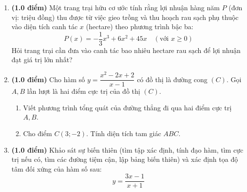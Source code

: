 \documentclass[12pt]{article}
\begin{document}
	\begin{enumerate}[label=\textbf{Bài \arabic*.}, leftmargin=*]
		
		\item \textbf{(1.0 điểm)} Một trang trại hữu cơ ước tính rằng lợi nhuận hàng năm $P$ (đơn vị: triệu đồng) thu được từ việc gieo trồng và thu hoạch rau sạch phụ thuộc vào diện tích canh tác $x$ (hectare) theo phương trình bậc ba:
		\[ P(x) = -\dfrac{1}{3}x^3 + 6x^2 + 45x \quad (\text{với } x \ge 0) \]
		Hỏi trang trại cần đưa vào canh tác bao nhiêu hectare rau sạch để lợi nhuận đạt giá trị lớn nhất?
		
		\vspace{3mm}
		\item \textbf{(1.0 điểm)} Cho hàm số $y = \dfrac{x^2 - 2x + 2}{x - 1}$ có đồ thị là đường cong $(C)$. Gọi $A, B$ lần lượt là hai điểm cực trị của đồ thị $(C)$.
		\begin{enumerate}[label=\alph*)]
			\item Viết phương trình tổng quát của đường thẳng đi qua hai điểm cực trị $A, B$.
			\item Cho điểm $C(3; -2)$. Tính diện tích tam giác $ABC$.
		\end{enumerate}
		
		\vspace{3mm}
		\item \textbf{(1.0 điểm)} Khảo sát sự biến thiên (tìm tập xác định, tính đạo hàm, tìm cực trị nếu có, tìm các đường tiệm cận, lập bảng biến thiên) và xác định tọa độ tâm đối xứng của hàm số sau: 
		\[ y = \dfrac{3x - 1}{x + 1} \]
		
	\end{enumerate}
	
\end{document}
